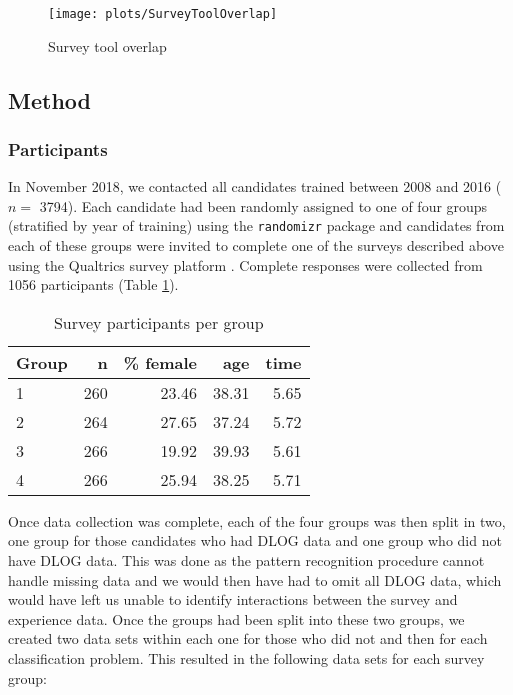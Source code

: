 \documentclass[a4paper,]{book}
\begin{document}
\begin{figure}
\texttt{[image: plots/SurveyToolOverlap]} \caption{Survey tool overlap}\label{fig:survey-tool-overlap}
\end{figure}

\hypertarget{method-2}{%
\subsection{Method}\label{method-2}}

\hypertarget{participants-2}{%
\subsubsection{Participants}\label{participants-2}}

In November 2018, we contacted all candidates trained between 2008 and 2016 (\(n =\) 3794). Each candidate had been randomly assigned to one of four groups (stratified by year of training) using the \texttt{randomizr} package \citep{R-randomizr} and candidates from each of these groups were invited to complete one of the surveys described above using the Qualtrics survey platform \citep{Qualtrics}. Complete responses were collected from 1056 participants (Table \ref{tab:study-2-participants}).

\begin{table}

\caption{\label{tab:study-2-participants}Survey participants per group}
\centering
\begin{tabular}[t]{lrrrr}
\toprule
Group & n & \% female & age & time\\
\midrule
1 & 260 & 23.46 & 38.31 & 5.65\\
2 & 264 & 27.65 & 37.24 & 5.72\\
3 & 266 & 19.92 & 39.93 & 5.61\\
4 & 266 & 25.94 & 38.25 & 5.71\\
\bottomrule
\end{tabular}
\end{table}

Once data collection was complete, each of the four groups was then split in two, one group for those candidates who had DLOG data and one group who did not have DLOG data. This was done as the pattern recognition procedure cannot handle missing data and we would then have had to omit all DLOG data, which would have left us unable to identify interactions between the survey and experience data. Once the groups had been split into these two groups, we created two data sets within each one for those who did not and then for each classification problem. This resulted in the following data sets for each survey group:
\end{document}
